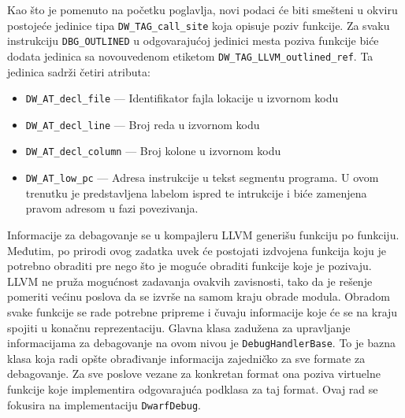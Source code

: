 \documentclass[12pt,oneside]{memoir}
\begin{document}
Kao što je pomenuto na početku poglavlja, novi podaci će biti smešteni u okviru postojeće jedinice tipa \verb|DW_TAG_call_site| koja opisuje poziv funkcije.
Za svaku instrukciju \verb|DBG_OUTLINED| u odgovarajućoj jedinici mesta poziva funkcije biće dodata jedinica sa novouvedenom etiketom \verb|DW_TAG_LLVM_outlined_ref|.
Ta jedinica sadrži četiri atributa:
\begin{itemize}
  \item \verb|DW_AT_decl_file| --- Identifikator fajla lokacije u izvornom kodu
  \item \verb|DW_AT_decl_line| --- Broj reda u izvornom kodu
  \item \verb|DW_AT_decl_column| --- Broj kolone u izvornom kodu
  \item \verb|DW_AT_low_pc| --- Adresa instrukcije u tekst segmentu programa. U ovom trenutku je predstavljena labelom ispred te intrukcije i biće zamenjena pravom adresom u fazi povezivanja.
\end{itemize}

Informacije za debagovanje se u kompajleru LLVM generišu funkciju po funkciju.
Međutim, po prirodi ovog zadatka uvek će postojati izdvojena funkcija koju je potrebno obraditi pre nego što je moguće obraditi funkcije koje je pozivaju.
LLVM ne pruža mogućnost zadavanja ovakvih zavisnosti, tako da je rešenje pomeriti većinu poslova da se izvrše na samom kraju obrade modula.
Obradom svake funkcije se rade potrebne pripreme i čuvaju informacije koje će se na kraju spojiti u konačnu reprezentaciju.
Glavna klasa zadužena za upravljanje informacijama za debagovanje na ovom nivou je \verb|DebugHandlerBase|.
To je bazna klasa koja radi opšte obrađivanje informacija zajedničko za sve formate za debagovanje.
Za sve poslove vezane za konkretan format ona poziva virtuelne funkcije koje implementira odgovarajuća podklasa za taj format.
Ovaj rad se fokusira na implementaciju \verb|DwarfDebug|.
\end{document}
